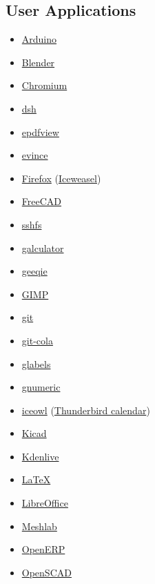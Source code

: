\subsection{User Applications}
\begin{itemize}
\item \href{http://www.arduino.cc/}{Arduino}
\item \href{http://www.blender.org/}{Blender}
\item \href{http://www.chromium.org/}{Chromium}
\item \href{https://www.sharelatex.com/project/530905c45bdef00b69001e69}{dsh}
\item \href{http://trac.emma-soft.com/epdfview/}{epdfview}
\item \href{http://www.gnome.org/projects/evince/}{evince}
\item \href{http://www.mozilla.org/en-US/firefox/}{Firefox} (\href{https://wiki.debian.org/Iceweasel}{Iceweasel})
\item \href{http://www.freecadweb.org/}{FreeCAD}
\item \href{http://fuse.sourceforge.net/sshfs.html}{sshfs}
\item \href{http://galculator.sourceforge.net/}{galculator}
\item \href{http://geeqie.sourceforge.net/}{geeqie}
\item \href{http://www.gimp.org/}{GIMP}
\item \href{http://git-scm.com/}{git}
\item \href{http://cola.tuxfamily.org/}{git-cola}
\item \href{http://glabels.sourceforge.net/}{glabels}
\item \href{http://www.gnumeric.org/}{gnumeric}
\item \href{https://packages.debian.org/wheezy/iceowl-extension}{iceowl} (\href{http://www.mozilla.org/en-US/thunderbird/}{Thunderbird calendar})
\item \href{http://iut-tice.ujf-grenoble.fr/kicad/}{Kicad}
\item \href{http://www.kdenlive.org/}{Kdenlive}
\item \href{http://www.latex-project.org/}{LaTeX}
\item \href{https://www.libreoffice.org/}{LibreOffice}
\item \href{http://meshlab.sourceforge.net/}{Meshlab}
\item \href{http://www.openerp.com/}{OpenERP}
\item \href{http://www.openscad.org/}{OpenSCAD}

\end{itemize}
